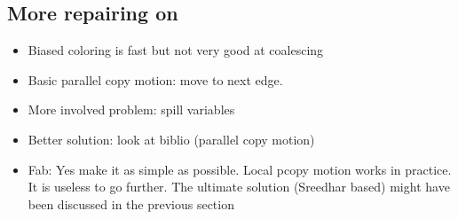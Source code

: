 {\subsection{More repairing on \phifuns}
\begin{itemize}
  \item Biased coloring is fast but not very good at coalescing
  \item Basic parallel copy motion: move to next edge.
  \item More involved problem: spill variables
  \item Better solution: look at biblio (parallel copy motion)
  \item Fab: Yes make it as simple as possible. Local pcopy motion works in practice. It is useless to go further. The ultimate solution (Sreedhar based) might have been discussed in the previous section
\end{itemize}


}
